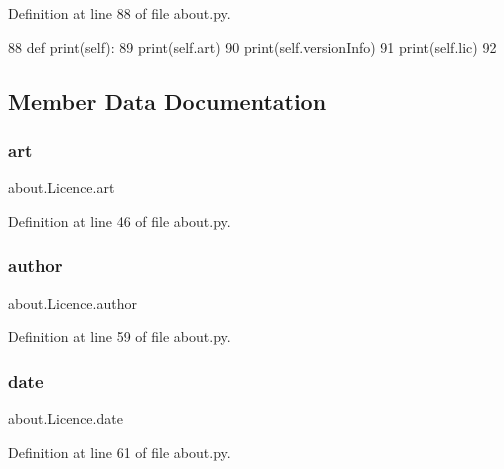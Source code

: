 Definition at line 88 of file about.\+py.


\begin{DoxyCode}
88     \textcolor{keyword}{def }print(self):
89         print(self.art)
90         print(self.versionInfo)
91         print(self.lic)
92 \end{DoxyCode}


\subsection{Member Data Documentation}
\mbox{\label{classabout_1_1_licence_a86ed9b8474a45be978024c106a690919}} 
\subsubsection{\texorpdfstring{art}{art}}
{\footnotesize\ttfamily about.\+Licence.\+art}



Definition at line 46 of file about.\+py.

\mbox{\label{classabout_1_1_licence_ac292e3400b704815fe91a2761f3ab2c1}} 
\subsubsection{\texorpdfstring{author}{author}}
{\footnotesize\ttfamily about.\+Licence.\+author}



Definition at line 59 of file about.\+py.

\mbox{\label{classabout_1_1_licence_a84e5350951df766d2e12760ac1016fcf}} 
\subsubsection{\texorpdfstring{date}{date}}
{\footnotesize\ttfamily about.\+Licence.\+date}



Definition at line 61 of file about.\+py.

